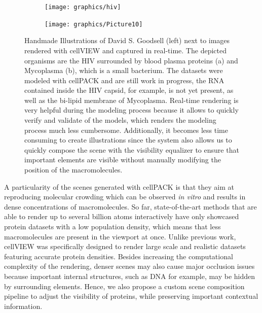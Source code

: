 \begin{figure}
	\centering
	\begin{subfigure}[b]{0.99\textwidth}
		\texttt{[image: graphics/hiv]}
	\end{subfigure}
	
	\begin{subfigure}[b]{0.99\textwidth}
		\texttt{[image: graphics/Picture10]}
	\end{subfigure}
	\caption{Handmade Illustrations of David S. Goodsell (left) next to images rendered with cellVIEW and captured in real-time. The depicted organisms are the HIV surrounded by blood plasma proteins (a) and Mycoplasma (b), which is a small bacterium. The datasets were modeled with cellPACK and are still work in progress, the RNA contained inside the HIV capsid, for example, is not yet present, as well as the bi-lipid membrane of Mycoplasma. Real-time rendering is very helpful during the modeling process because it allows to quickly verify and validate of the models, which renders the modeling process much less cumbersome. Additionally, it becomes less time consuming to create illustrations since the system also allows us to quickly compose the scene with the visibility equalizer to ensure that important elements are visible without manually modifying the position of the macromolecules.}
	\label{fig:cellVIEWvsGoodsell}
\end{figure}

A particularity of the scenes generated with cellPACK is that they aim at reproducing molecular crowding which can be observed \textit{in vitro} and results in dense concentrations of macromolecules.
So far, state-of-the-art methods that are able to render up to several billion atoms interactively have only showcased protein datasets with a low population density, which means that less macromolecules are present in the viewport at once.
Unlike previous work, cellVIEW was specifically designed to render large scale and realistic datasets featuring accurate protein densities.
Besides increasing the computational complexity of the rendering, denser scenes may also cause major occlusion issues because important internal structures, such as DNA for example, may be hidden by surrounding elements.
Hence, we also propose a custom scene composition pipeline to adjust the visibility of proteins, while preserving important contextual information.

